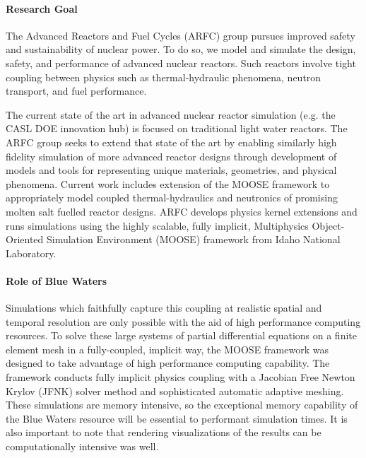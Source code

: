 \documentclass[11pt]{article}
\newcommand{\authorname}{Kathryn~D.~Huff }
\newcommand{\authorsite}{arfc.npre.illinois.edu}
\begin{document}
\pagestyle{fancy}
\lhead{\textcolor{gray}{Investigator: Prof. \authorname\\Presenter: Dr. Alexander Lindsay}}
\rhead{\textcolor{gray}{Advanced Reactors and Fuel Cycles\\}}
\renewcommand{\headrulewidth}{0pt}
\renewcommand{\footrulewidth}{0pt}
\fancyfoot[C]{\footnotesize \textcolor{gray}{\authorsite}}

\paragraph{Research Goal}

The Advanced Reactors and Fuel Cycles (ARFC) group pursues improved safety and
sustainability of nuclear power. To do so, we model and
simulate the design, safety, and performance of advanced nuclear reactors.
Such reactors  involve tight coupling between physics such as thermal-hydraulic
phenomena, neutron transport, and fuel performance.

The current state of the art in advanced nuclear reactor simulation (e.g. the
CASL DOE innovation hub) is focused on traditional light water reactors.
The ARFC group seeks to extend that state of the art by enabling similarly high fidelity simulation of more advanced reactor designs through development of models and tools for representing unique materials, geometries, and physical phenomena. Current work includes extension
of the MOOSE framework to appropriately model coupled thermal-hydraulics and
neutronics of promising molten salt fuelled reactor designs.
ARFC develops physics kernel extensions and runs simulations using the highly
scalable, fully implicit, Multiphysics Object-Oriented Simulation Environment
(MOOSE) framework from Idaho National Laboratory.


\paragraph{Role of Blue Waters}
Simulations which faithfully capture this coupling at realistic spatial and
temporal resolution are only possible with the aid of high performance
computing resources.  To solve these large systems of partial differential
equations on a finite element mesh in a fully-coupled, implicit way, the MOOSE
framework was designed to take advantage of high performance computing
capability.  The framework conducts fully implicit physics coupling with a
Jacobian Free Newton Krylov (JFNK) solver method and sophisticated automatic
adaptive meshing.  These simulations are memory intensive, so the exceptional
memory capability of the Blue Waters resource will be essential to performant
simulation times. It is also important to note that rendering visualizations of
the results can be computationally intensive was well.
\end{document}
